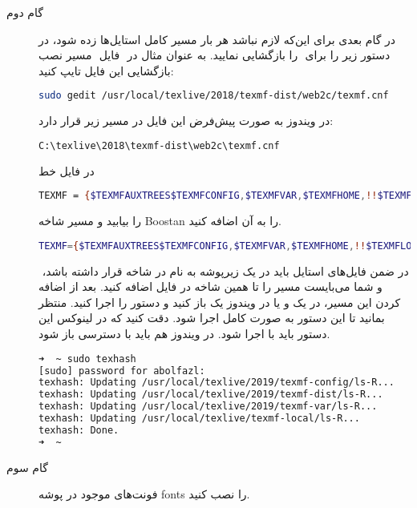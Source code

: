 \documentclass{report}
\begin{document}
\begin{description}
\item[گام دوم]
در گام بعدی برای این‌که لازم نباشد هر بار مسیر کامل استایل‌ها زده شود، در مسیر نصب ‎‎ فایل ‎‎ را بازگشایی نمایید. به عنوان مثال در ‎‎ دستور زیر را برای بازگشایی این فایل تایپ کنید:
\begin{lstlisting}[language=bash]
sudo gedit /usr/local/texlive/2018/texmf-dist/web2c/texmf.cnf
\end{lstlisting}
در ویندوز به صورت پیش‌فرض این فایل در مسیر زیر قرار دارد:
\begin{lstlisting}[language=bash]
 C:\texlive\2018\texmf-dist\web2c\texmf.cnf
\end{lstlisting}
در فایل
خط
\begin{lstlisting}[language=bash]
TEXMF = {$TEXMFAUXTREES$TEXMFCONFIG,$TEXMFVAR,$TEXMFHOME,!!$TEXMFLOCAL,!!$TEXMFSYSCONFIG,!!$TEXMFSYSVAR,!!$TEXMFDIST}
\end{lstlisting}
 را بیابید و مسیر شاخه Boostan را به آن اضافه کنید.
\begin{lstlisting}[language=bash]
TEXMF={$TEXMFAUXTREES$TEXMFCONFIG,$TEXMFVAR,$TEXMFHOME,!!$TEXMFLOCAL,!!$TEXMFSYSCONFIG,!!$TEXMFSYSVAR,!!$TEXMFDIST,/home/abolfazl/Documents/Boostan}
\end{lstlisting}
‎ در ضمن فایل‌های استایل باید در یک زیرپوشه به نام
در شاخه 
قرار داشته باشد، و شما می‌بایست مسیر را تا همین شاخه  در فایل
 اضافه کنید. بعد از اضافه کردن این مسیر، در 
 یک  و یا در ویندوز یک 
باز کنید و دستور
را اجرا کنید. منتظر بمانید تا این دستور به صورت کامل اجرا شود. دقت کنید که در لینوکس این دستور باید با 
اجرا شود. در ویندوز هم باید 
با دسترسی 
باز شود. 
\begin{lstlisting}[language=bash]
➜  ~ sudo texhash
[sudo] password for abolfazl: 
texhash: Updating /usr/local/texlive/2019/texmf-config/ls-R... 
texhash: Updating /usr/local/texlive/2019/texmf-dist/ls-R... 
texhash: Updating /usr/local/texlive/2019/texmf-var/ls-R... 
texhash: Updating /usr/local/texlive/texmf-local/ls-R... 
texhash: Done.
➜  ~ 
\end{lstlisting}

\item[گام سوم]
فونت‌های موجود در پوشه fonts را نصب کنید.


\end{description}
\end{document}
